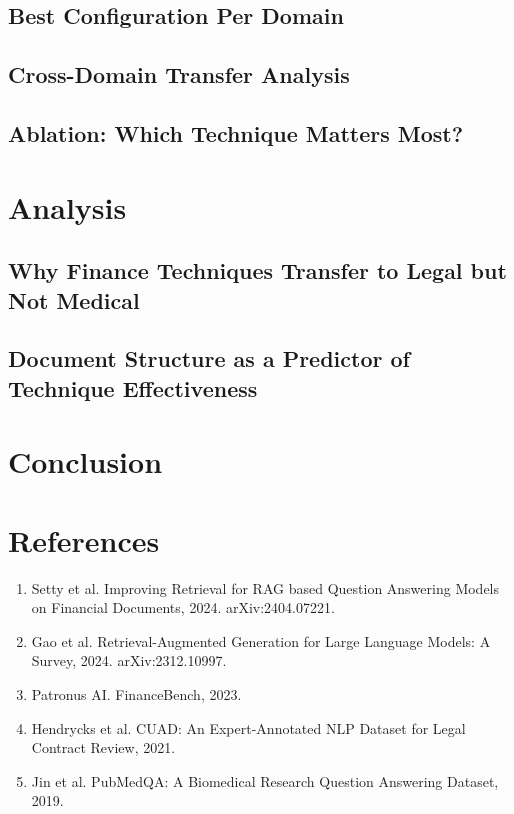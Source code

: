 \documentclass{article}
\begin{document}
\subsection{Best Configuration Per Domain}
\subsection{Cross-Domain Transfer Analysis}
\subsection{Ablation: Which Technique Matters Most?}

\section{Analysis}
\subsection{Why Finance Techniques Transfer to Legal but Not Medical}
\subsection{Document Structure as a Predictor of Technique Effectiveness}

\section{Conclusion}

\section*{References}
\small
\begin{enumerate}
    \item Setty et al. Improving Retrieval for RAG based Question Answering Models on Financial Documents, 2024. arXiv:2404.07221.
    \item Gao et al. Retrieval-Augmented Generation for Large Language Models: A Survey, 2024. arXiv:2312.10997.
    \item Patronus AI. FinanceBench, 2023.
    \item Hendrycks et al. CUAD: An Expert-Annotated NLP Dataset for Legal Contract Review, 2021.
    \item Jin et al. PubMedQA: A Biomedical Research Question Answering Dataset, 2019.
\end{enumerate}
\end{document}
